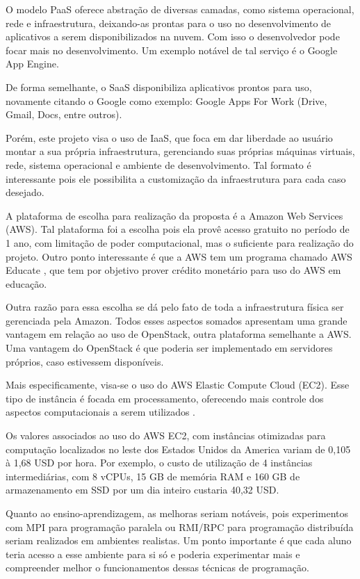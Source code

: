 \documentclass[12pt]{article}
\begin{document}
O modelo PaaS oferece abstração de diversas camadas, como sistema operacional, rede e infraestrutura, deixando-as prontas para o uso no desenvolvimento de aplicativos a serem disponibilizados na nuvem. Com isso o desenvolvedor pode focar mais no desenvolvimento. Um exemplo notável de tal serviço é o Google App Engine.

De forma semelhante, o SaaS disponibiliza aplicativos prontos para uso, novamente citando o Google como exemplo: Google Apps For Work (Drive, Gmail, Docs, entre outros).

Porém, este projeto visa o uso de IaaS, que foca em dar liberdade ao usuário montar a sua própria infraestrutura, gerenciando suas próprias máquinas virtuais, rede, sistema operacional e ambiente de desenvolvimento. Tal formato é interessante pois ele possibilita a customização da infraestrutura para cada caso desejado.

A plataforma de escolha para realização da proposta é a Amazon Web Services (AWS). Tal plataforma foi a escolha pois ela provê acesso gratuito no período de 1 ano, com limitação de poder computacional, mas o  suficiente para realização do projeto. Outro ponto interessante é que a AWS tem um programa chamado AWS Educate \cite{awsedu}, que tem por objetivo prover crédito monetário para uso do AWS em educação.

Outra razão para essa escolha se dá pelo fato de toda a infraestrutura física ser gerenciada pela Amazon. Todos esses aspectos somados apresentam uma grande vantagem em relação ao uso de OpenStack, outra plataforma semelhante a AWS. Uma vantagem do OpenStack é que poderia ser implementado em servidores próprios, caso estivessem disponíveis.

Mais especificamente, visa-se o uso do AWS Elastic Compute Cloud (EC2). Esse tipo de instância é focada em processamento, oferecendo mais controle dos aspectos computacionais a serem utilizados \cite{ec2}.

Os valores associados ao uso do AWS EC2, com instâncias otimizadas para computação localizados no leste dos Estados Unidos da America variam de 0,105 à 1,68 USD por hora. Por exemplo, o custo de utilização de 4 instâncias intermediárias, com 8 vCPUs, 15 GB de memória RAM e 160 GB de armazenamento em SSD por um dia inteiro custaria 40,32 USD.

Quanto ao ensino-aprendizagem, as melhoras seriam notáveis, pois experimentos com MPI para programação paralela ou RMI/RPC para programação distribuída seriam realizados em ambientes realistas. Um ponto importante é que cada aluno teria acesso a esse ambiente para si só e poderia experimentar mais e compreender melhor o funcionamentos dessas técnicas de programação.
\end{document}
